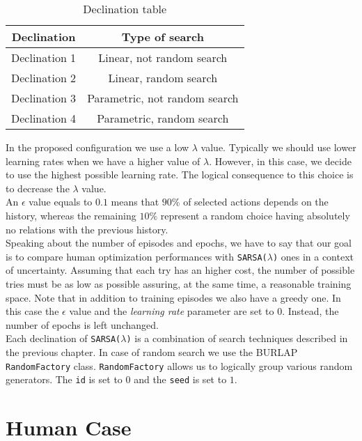\begin{table} [h!]
	\centering	
	\begin{tabular}{|c|c|}
		\hline \textbf{Declination}
		& \textbf{Type of search} \\ 
		\hline Declination 1
		&  Linear, not random search\\ 
		\hline Declination 2
		& Linear, random search \\ 
		\hline Declination 3
		& Parametric, not random search \\ 
		\hline Declination 4
		&  Parametric, random search\\ 
		\hline 
	\end{tabular} 
\caption{Declination table}
\label{DeclinationTable}
\end{table}

In the proposed configuration we use a low $\lambda$ value. Typically we should use lower learning rates when we have a higher value of $\lambda$. However, in this case, we decide to use the highest possible learning rate. The logical consequence to this choice is to decrease the $\lambda$ value. \\

An $\epsilon$ value equals to $0.1$ means that $90\%$ of selected actions depends on the history, whereas the remaining $10\%$ represent a random choice having absolutely no relations with the previous history. \\ 

Speaking about the number of episodes and epochs, we have to say that our goal is to compare human optimization performances with {\tt SARSA($\lambda$)} ones in a context of uncertainty. Assuming that each try has an higher cost, the number of possible tries must be as low as possible assuring, at the same time, a reasonable training space. Note that in addition to training episodes we also have a greedy one. In this case the $\epsilon$ value and the \textit{learning rate} parameter are set to $0$. Instead, the number of epochs is left unchanged.  \\

Each declination of {\tt SARSA(\textit{$\lambda$})} is a combination of search techniques described in the previous chapter. In case of random search we use the BURLAP {\tt RandomFactory} class. {\tt RandomFactory} allows us to logically group various random generators. The {\tt id} is set to $0$ and the {\tt seed} is set to $1$.

\section{Human Case}


